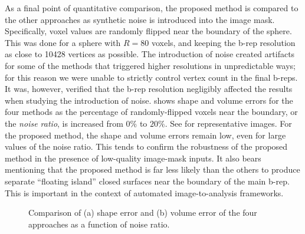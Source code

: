 As a final point of quantitative comparison, the proposed method is compared to the other approaches as synthetic noise is introduced into the image mask. Specifically, voxel values are randomly flipped near the boundary of the sphere. This was done for a sphere with $R = 80$ voxels, and keeping the b-rep resolution as close to 10428 vertices as possible.  The introduction of noise created artifacts for some of the methods that triggered higher resolutions in unpredictable ways; for this reason we were unable to strictly control vertex count in the final b-reps. It was, however, verified that the b-rep resolution negligibly affected the results when studying the introduction of noise.  shows shape and volume errors for the four methods as the percentage of randomly-flipped voxels near the boundary, or the {\em noise ratio}, is increased from $0\%$ to $20\%$. See  for representative images.  For the proposed method, the shape and volume errors remain low, even for large values of the noise ratio. This tends to confirm the robustness of the proposed method in the presence of low-quality image-mask inputs. It also bears mentioning that the proposed method is far less likely than the others to produce separate ``floating island'' closed surfaces near the boundary of the main b-rep.  This is important in the context of automated image-to-analysis frameworks.
\begin{figure}[t!]
	\centering
	\caption{Comparison of (a) shape error and (b) volume error of the four approaches as a function of noise ratio.}
	\label{fig:graph4}
\end{figure}
